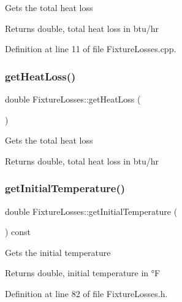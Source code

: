 Gets the total heat loss \begin{DoxyReturn}{Returns}
double, total heat loss in btu/hr 
\end{DoxyReturn}


Definition at line 11 of file Fixture\+Losses.\+cpp.

\mbox{\label{class_fixture_losses_a6829840bdf0607d52adaa9b5ee6ded75}} 
\subsubsection{\texorpdfstring{get\+Heat\+Loss()}{getHeatLoss()}\hspace{0.1cm}{\footnotesize\ttfamily [3/3]}}
{\footnotesize\ttfamily double Fixture\+Losses\+::get\+Heat\+Loss (\begin{DoxyParamCaption}{ }\end{DoxyParamCaption})}

Gets the total heat loss \begin{DoxyReturn}{Returns}
double, total heat loss in btu/hr 
\end{DoxyReturn}
\mbox{\label{class_fixture_losses_aaa2e1042b71482b377e93d675909f78e}} 
\subsubsection{\texorpdfstring{get\+Initial\+Temperature()}{getInitialTemperature()}\hspace{0.1cm}{\footnotesize\ttfamily [1/3]}}
{\footnotesize\ttfamily double Fixture\+Losses\+::get\+Initial\+Temperature (\begin{DoxyParamCaption}{ }\end{DoxyParamCaption}) const\hspace{0.3cm}{\ttfamily [inline]}}

Gets the initial temperature \begin{DoxyReturn}{Returns}
double, initial temperature in °F 
\end{DoxyReturn}


Definition at line 82 of file Fixture\+Losses.\+h.

